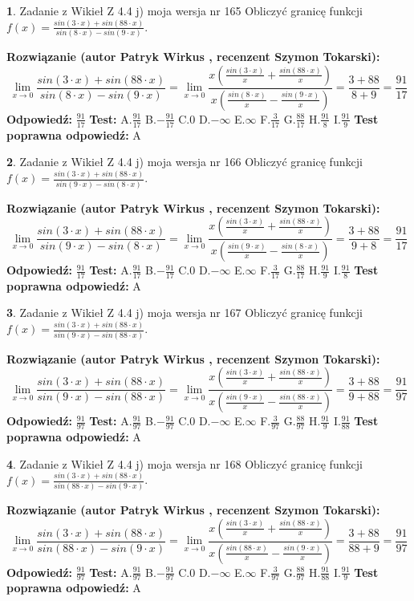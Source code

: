 \documentclass[12pt, a4paper]{article}
\theoremstyle{definition} %
\newtheorem{zad}{}
\newcommand{\zadStart}[1]{\begin{zad}#1\newline}
\newcommand{\zadStop}{\end{zad}}
\newcommand{\rozwStart}[2]{\noindent \textbf{Rozwiązanie (autor #1 , recenzent #2): }\newline}
\newcommand{\rozwStop}{\newline}
\newcommand{\odpStart}{\noindent \textbf{Odpowiedź:}\newline}
\newcommand{\odpStop}{\newline}
\newcommand{\testStart}{\noindent \textbf{Test:}\newline}
\newcommand{\testStop}{\newline}
\newcommand{\kluczStart}{\noindent \textbf{Test poprawna odpowiedź:}\newline}
\newcommand{\kluczStop}{\newline}
\begin{document}
\zadStart{Zadanie z Wikieł Z 4.4 j) moja wersja nr 165}
Obliczyć granicę funkcji $f(x)=\frac{sin(3\cdot x) +sin(88\cdot x)}{sin(8\cdot x) -sin(9\cdot x)}$.
\zadStop
\rozwStart{Patryk Wirkus}{Szymon Tokarski}
$$\lim\limits_{x\to 0}\frac{sin(3\cdot x) +sin(88\cdot x)}{sin(8\cdot x) -sin(9\cdot x)}=\lim\limits_{x\to 0}\frac{x(\frac{sin(3\cdot x)}{x}+\frac{sin(88\cdot x)}{x})}{x(\frac{sin(8\cdot x)}{x}-\frac{sin(9\cdot x)}{x})}=\frac{3+88}{8+9} = \frac{91}{17}$$
\rozwStop
\odpStart
$\frac{91}{17}$
\odpStop
\testStart
A.$\frac{91}{17}$
B.$-\frac{91}{17}$
C.$0$
D.$-\infty$
E.$\infty$
F.$\frac{3}{17}$
G.$\frac{88}{17}$
H.$\frac{91}{8}$
I.$\frac{91}{9}$
\testStop
\kluczStart
A
\kluczStop



\zadStart{Zadanie z Wikieł Z 4.4 j) moja wersja nr 166}
Obliczyć granicę funkcji $f(x)=\frac{sin(3\cdot x) +sin(88\cdot x)}{sin(9\cdot x) -sin(8\cdot x)}$.
\zadStop
\rozwStart{Patryk Wirkus}{Szymon Tokarski}
$$\lim\limits_{x\to 0}\frac{sin(3\cdot x) +sin(88\cdot x)}{sin(9\cdot x) -sin(8\cdot x)}=\lim\limits_{x\to 0}\frac{x(\frac{sin(3\cdot x)}{x}+\frac{sin(88\cdot x)}{x})}{x(\frac{sin(9\cdot x)}{x}-\frac{sin(8\cdot x)}{x})}=\frac{3+88}{9+8} = \frac{91}{17}$$
\rozwStop
\odpStart
$\frac{91}{17}$
\odpStop
\testStart
A.$\frac{91}{17}$
B.$-\frac{91}{17}$
C.$0$
D.$-\infty$
E.$\infty$
F.$\frac{3}{17}$
G.$\frac{88}{17}$
H.$\frac{91}{9}$
I.$\frac{91}{8}$
\testStop
\kluczStart
A
\kluczStop



\zadStart{Zadanie z Wikieł Z 4.4 j) moja wersja nr 167}
Obliczyć granicę funkcji $f(x)=\frac{sin(3\cdot x) +sin(88\cdot x)}{sin(9\cdot x) -sin(88\cdot x)}$.
\zadStop
\rozwStart{Patryk Wirkus}{Szymon Tokarski}
$$\lim\limits_{x\to 0}\frac{sin(3\cdot x) +sin(88\cdot x)}{sin(9\cdot x) -sin(88\cdot x)}=\lim\limits_{x\to 0}\frac{x(\frac{sin(3\cdot x)}{x}+\frac{sin(88\cdot x)}{x})}{x(\frac{sin(9\cdot x)}{x}-\frac{sin(88\cdot x)}{x})}=\frac{3+88}{9+88} = \frac{91}{97}$$
\rozwStop
\odpStart
$\frac{91}{97}$
\odpStop
\testStart
A.$\frac{91}{97}$
B.$-\frac{91}{97}$
C.$0$
D.$-\infty$
E.$\infty$
F.$\frac{3}{97}$
G.$\frac{88}{97}$
H.$\frac{91}{9}$
I.$\frac{91}{88}$
\testStop
\kluczStart
A
\kluczStop



\zadStart{Zadanie z Wikieł Z 4.4 j) moja wersja nr 168}
Obliczyć granicę funkcji $f(x)=\frac{sin(3\cdot x) +sin(88\cdot x)}{sin(88\cdot x) -sin(9\cdot x)}$.
\zadStop
\rozwStart{Patryk Wirkus}{Szymon Tokarski}
$$\lim\limits_{x\to 0}\frac{sin(3\cdot x) +sin(88\cdot x)}{sin(88\cdot x) -sin(9\cdot x)}=\lim\limits_{x\to 0}\frac{x(\frac{sin(3\cdot x)}{x}+\frac{sin(88\cdot x)}{x})}{x(\frac{sin(88\cdot x)}{x}-\frac{sin(9\cdot x)}{x})}=\frac{3+88}{88+9} = \frac{91}{97}$$
\rozwStop
\odpStart
$\frac{91}{97}$
\odpStop
\testStart
A.$\frac{91}{97}$
B.$-\frac{91}{97}$
C.$0$
D.$-\infty$
E.$\infty$
F.$\frac{3}{97}$
G.$\frac{88}{97}$
H.$\frac{91}{88}$
I.$\frac{91}{9}$
\testStop
\kluczStart
A
\kluczStop
\end{document}
